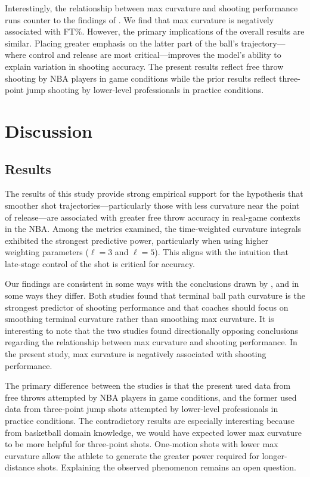 \documentclass{article}
\begin{document}
    Interestingly, the relationship between max curvature and shooting performance runs counter to the findings of \citet{slegers_role_2024}. We find that max curvature is negatively associated with FT\%. However, the primary implications of the overall results are similar. Placing greater emphasis on the latter part of the ball's trajectory---where control and release are most critical---improves the model's ability to explain variation in shooting accuracy. The present results reflect free throw shooting by NBA players in game conditions while the prior results reflect three-point jump shooting by lower-level professionals in practice conditions.

\section{Discussion}

    \subsection{Results}
      
      The results of this study provide strong empirical support for the hypothesis that smoother shot trajectories---particularly those with less curvature near the point of release---are associated with greater free throw accuracy in real-game contexts in the NBA. Among the metrics examined, the time-weighted curvature integrals exhibited the strongest predictive power, particularly when using higher weighting parameters (\(\ell=3\) and \(\ell=5\)). This aligns with the intuition that late-stage control of the shot is critical for accuracy.
      
      Our findings are consistent in some ways with the conclusions drawn by \citet{slegers_role_2024}, and in some ways they differ. Both studies found that terminal ball path curvature is the strongest predictor of shooting performance and that coaches should focus on smoothing terminal curvature rather than smoothing max curvature. It is interesting to note that the two studies found directionally opposing conclusions regarding the relationship between max curvature and shooting performance. In the present study, max curvature is negatively associated with shooting performance.

      The primary difference between the studies is that the present used data from free throws attempted by NBA players in game conditions, and the former used data from three-point jump shots attempted by lower-level professionals in practice conditions. The contradictory results are especially interesting because from basketball domain knowledge, we would have expected lower max curvature to be more helpful for three-point shots. One-motion shots with lower max curvature allow the athlete to generate the greater power required for longer-distance shots. Explaining the observed phenomenon remains an open question. 
      
\end{document}
